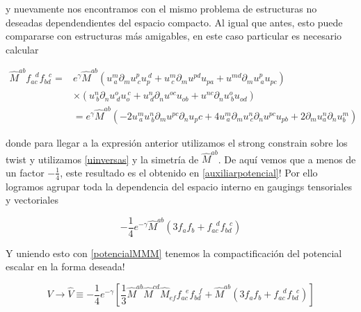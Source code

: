 \documentclass{article}
\numberwithin{equation}{section}
\begin{document}
y nuevamente nos encontramos con el mismo problema de estructuras no deseadas dependendientes del espacio compacto. Al igual que antes, esto puede compararse con estructuras más amigables, en este caso particular es necesario calcular

\begin{equation}
\begin{aligned}
\hat{M}^{a b} f_{a c}^{\ \ \ d} f_{b d}^{\ \ \ c} =& e^{\gamma} \hat{M}^{a b} \left( u^{m}_{ \ a} \partial_m u^{p}_{\ c} u_{ p}^{\ d} + u^{m}_{ \ c} \partial_m u^{p d} u_{ p a} + u^{m d} \partial_m u^{p}_{\ a} u_{ p c} \right)\\
&\times \left( u^{n}_{ \ b} \partial_n u^{o}_{\ d} u_{ o}^{\ c} + u^{n}_{ \ d} \partial_n u^{o c} u_{ o b} + u^{n c} \partial_n u^{o}_{\ b} u_{ o d} \right)\\
&=  e^{\gamma} \hat{M}^{a b} \left( -2 u^{m}_{ \ a} u^{n}_{ \ b} \partial_m u^{p c} \partial_n u_p c + 4 u^{m}_{ \ a} \partial_m u^{n}_{ \ c} \partial_n u^{p c} u_{p b} + 2 \partial_m u^{n}_a \partial_n u^m_b \right)
\end{aligned}
\end{equation}

donde para llegar a la expresión anterior utilizamos el strong constrain sobre los twist y utilizamos \ref{uinversas} y la simetría de $ \hat{M}^{a b} $. De aquí vemos que a menos de un factor $ -\frac{1}{4} $, este resultado es el obtenido en \ref{auxiliarpotencial}! Por ello logramos agrupar toda la dependencia del espacio interno en gaugings tensoriales y vectoriales

\begin{equation}
-\frac{1}{4} e^{-\gamma} \hat{M}^{a b} \left( 3 f_a f_b + f_{a c}^{\ \ \ d} f_{b d}^{\ \ \ c} \right) 
\end{equation}

Y uniendo esto con \ref{potencialMMM} tenemos la compactificación del potencial escalar en la forma deseada!\\

\begin{boxquation}
\begin{equation}
V \longrightarrow \hat{V} \equiv -\frac{1}{4} e^{- \gamma} \left[ \frac{1}{3} \hat{M}^{a b} \hat{M}^{c d}\hat{M}_{e f} f_{a c}^{\ \ \ e} f_{b d}^{\ \ \ f}  + \hat{M}^{a b} \left( 3 f_a f_b + f_{a c}^{\ \ \ d} f_{b d}^{\ \ \ c} \right)  \right]
\end{equation}
\end{boxquation}
\end{document}
